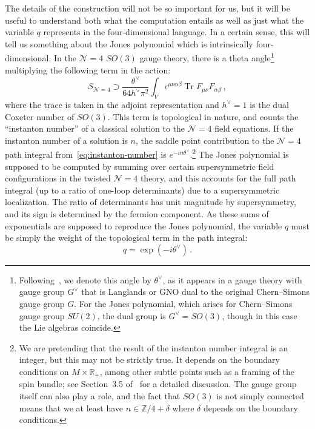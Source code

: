 \documentclass[11pt]{article}
\DeclareMathOperator{\Tr}{Tr}
\numberwithin{equation}{section}
\begin{document}
The details of the construction will not be so important for us, but it will be useful to understand both what the computation entails as well as just what the variable $q$ represents in the four-dimensional language.
In a certain sense, this will tell us something about the Jones polynomial which is intrinsically four-dimensional.
In the $\mathcal{N}=4$ $SO(3)$ gauge theory, there is a theta angle\footnote{Following~\cite{Witten:2011zz}, we denote this angle by $\theta^\vee$, as it appears in a gauge theory with gauge group $G^\vee$ that is Langlands or GNO dual to the original Chern--Simons gauge group $G$.
For the Jones polynomial, which arises for Chern--Simons gauge group $SU(2)$, the dual group is $G^\vee = SO(3)$, though in this case the Lie algebras coincide.}
multiplying the following term in the action:
\begin{equation}
    S_{\mathcal{N}=4} \supset \frac{\theta^\vee}{64h^\vee \pi^2} \int_V \epsilon^{\mu\nu\alpha\beta} \Tr F_{\mu\nu} F_{\alpha\beta} \,,
\label{eq:instanton-number}
\end{equation}
where the trace is taken in the adjoint representation and $h^\vee = 1$ is the dual Coxeter number of $SO(3)$.
This term is topological in nature, and counts the ``instanton number'' of a classical solution to the $\mathcal{N}=4$ field equations.
If the instanton number of a solution is $n$, the saddle point contribution to the $\mathcal{N}=4$ path integral from~\eqref{eq:instanton-number} is $e^{-in\theta^\vee}$.\footnote{We are pretending that the result of the instanton number integral is an integer, but this may not be strictly true.
It depends on the boundary conditions on $M \times \mathbb{R}_+$, among other subtle points such as a framing of the spin bundle; see Section~3.5 of~\cite{Witten:2011zz} for a detailed discussion.
The gauge group itself can also play a role, and the fact that $SO(3)$ is not simply connected means that we at least have $n \in \mathbb{Z}/4 + \delta$ where $\delta$ depends on the boundary conditions.}
The Jones polynomial is supposed to be computed by summing over certain supersymmetric field configurations in the twisted $\mathcal{N}=4$ theory, and this accounts for the full path integral (up to a ratio of one-loop determinants) due to a supersymmetric localization.
The ratio of determinants has unit magnitude by supersymmetry, and its sign is determined by the fermion component.
As these sums of exponentials are supposed to reproduce the Jones polynomial, the variable $q$ must be simply the weight of the topological term in the path integral:
\begin{equation}
    q = \exp ( - i \theta^\vee ) \,.
\end{equation}
\end{document}

